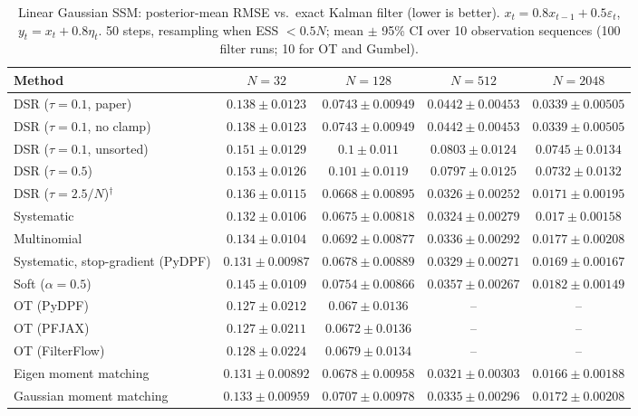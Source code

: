 \begin{table}[H]
\centering
\small
\caption{Linear Gaussian SSM: posterior-mean RMSE vs.\ exact Kalman filter (lower is better). $x_t=0.8x_{t-1}+0.5\varepsilon_t$, $y_t=x_t+0.8\eta_t$. 50 steps, resampling when ESS $<0.5N$; mean $\pm$ 95\% CI over 10 observation sequences (100 filter runs; 10 for OT and Gumbel).}
\label{tab:linear-posterior_mean_rmse}
\begin{adjustbox}{max width=\linewidth}
\begin{tabular}{lcccc}
\toprule
Method & $N{=}32$ & $N{=}128$ & $N{=}512$ & $N{=}2048$ \\
\midrule
DSR ($\tau{=}0.1$, paper) & $0.138\pm0.0123$ & $0.0743\pm0.00949$ & $0.0442\pm0.00453$ & $0.0339\pm0.00505$ \\
DSR ($\tau{=}0.1$, no clamp) & $0.138\pm0.0123$ & $0.0743\pm0.00949$ & $0.0442\pm0.00453$ & $0.0339\pm0.00505$ \\
DSR ($\tau{=}0.1$, unsorted) & $0.151\pm0.0129$ & $0.1\pm0.011$ & $0.0803\pm0.0124$ & $0.0745\pm0.0134$ \\
DSR ($\tau{=}0.5$) & $0.153\pm0.0126$ & $0.101\pm0.0119$ & $0.0797\pm0.0125$ & $0.0732\pm0.0132$ \\
DSR ($\tau{=}2.5/N$)$^\dagger$ & $0.136\pm0.0115$ & $\mathbf{0.0668\pm0.00895}$ & $0.0326\pm0.00252$ & $0.0171\pm0.00195$ \\
\midrule
Systematic & $0.132\pm0.0106$ & $0.0675\pm0.00818$ & $0.0324\pm0.00279$ & $0.017\pm0.00158$ \\
Multinomial & $0.134\pm0.0104$ & $0.0692\pm0.00877$ & $0.0336\pm0.00292$ & $0.0177\pm0.00208$ \\
Systematic, stop-gradient (PyDPF) & $0.131\pm0.00987$ & $0.0678\pm0.00889$ & $0.0329\pm0.00271$ & $0.0169\pm0.00167$ \\
Soft ($\alpha{=}0.5$) & $0.145\pm0.0109$ & $0.0754\pm0.00866$ & $0.0357\pm0.00267$ & $0.0182\pm0.00149$ \\
OT (PyDPF) & $0.127\pm0.0212$ & $0.067\pm0.0136$ & -- & -- \\
OT (PFJAX) & $\mathbf{0.127\pm0.0211}$ & $0.0672\pm0.0136$ & -- & -- \\
OT (FilterFlow) & $0.128\pm0.0224$ & $0.0679\pm0.0134$ & -- & -- \\
Eigen moment matching & $0.131\pm0.00892$ & $0.0678\pm0.00958$ & $\mathbf{0.0321\pm0.00303}$ & $\mathbf{0.0166\pm0.00188}$ \\
Gaussian moment matching & $0.133\pm0.00959$ & $0.0707\pm0.00978$ & $0.0335\pm0.00296$ & $0.0172\pm0.00208$ \\

\end{tabular}
\end{adjustbox}
\end{table}
